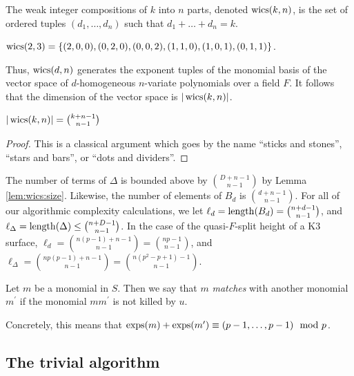 \begin{defn}
    The weak integer compositions of $k$ into $n$ parts, 
    denoted $\operatorname{wics}(k, n)$, is the set of ordered tuples 
	\((d_{1}, \ldots, d_{n})\) such that 
    \(d_{1} + \ldots + d_{n} = k\).
\end{defn}

\begin{ex}
    $\operatorname{wics}(2, 3) = \lbrace (2, 0, 0), (0, 2, 0), (0, 0, 2), (1, 1, 0), (1, 0, 1), (0, 1, 1) \rbrace$.
\end{ex}

Thus, $\operatorname{wics}(d, n)$ generates the exponent tuples of the 
monomial basis of the vector space of $d$-homogeneous 
$n$-variate polynomials over a field $F$.
It follows that the dimension of the vector space is $|\operatorname{wics}(k, n)|$.

\begin{lem}
    \label{lem:wics:size}
    $|\operatorname{wics}(k, n)| = \binom{k + n - 1}{n - 1}$
\end{lem}

\begin{proof}
	This is a classical argument which goes by the 
    name ``sticks and stones'', ``stars and bars'', or 
    ``dots and dividers''.
\end{proof}


\begin{rmk}
    The number of terms of \(\Delta\) is bounded 
    above by \(\binom{D+n-1}{n-1}\) by Lemma \ref{lem:wics:size}.
    Likewise, the number of elements of 
    \(B_{d}\) is \(\binom{d+n-1}{n-1}\).
    For all of our algorithmic complexity calculations, 
    we let $\ell_{d} = \operatorname{length}(B_{d}) = \binom{n + d - 1}{n - 1}$, 
    and $\ell_{\Delta} = \operatorname{length}(\Delta) \leq \binom{n + D - 1}{n - 1}$.
    In the case of the quasi-\(F\)-split height of a K3 surface, 
    $\ell_{d} = \binom{n(p - 1) + n - 1}{n - 1} = \binom{np - 1}{n - 1}$, 
    and $\ell_{\Delta} = \binom{np(p - 1) + n - 1}{n - 1} = \binom{n(p^2 - p + 1) - 1}{n - 1}$.
\end{rmk}

\begin{defn}
	Let \(m\) be a monomial in \(S\). 
	Then we say that \(m\) \textit{matches}
	with another monomial \(m^{\prime}\) 
	if the monomial \(mm^{\prime}\) is
	not killed by \(u\).
\end{defn}

Concretely, this means that $\operatorname{exps}(m) + \operatorname{exps}(m^{\prime}) \equiv (p - 1, \dots, p - 1) \mod p$.

\subsection{The trivial algorithm}

